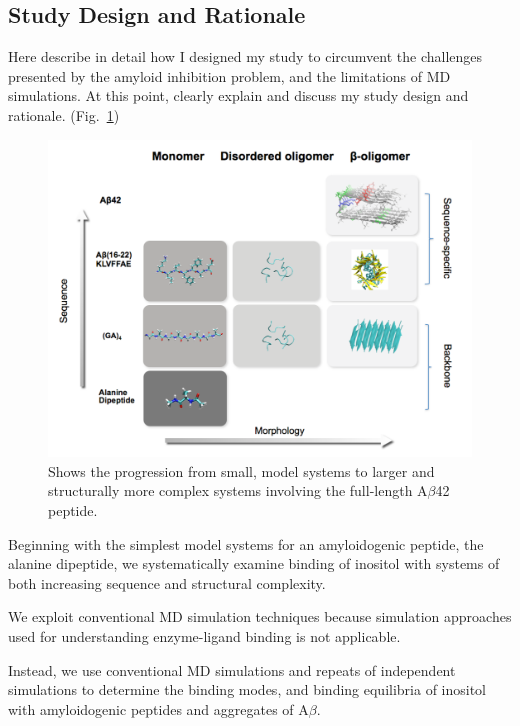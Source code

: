 \subsection{Study Design and Rationale}
\begin{outline}
	\1 Here describe in detail how I designed my study to circumvent the challenges presented by the amyloid inhibition problem, and the limitations  of MD simulations. At this point, clearly explain and discuss my study design and rationale. (Fig.~\ref{fig:rationale})

  \begin{figure}
    \centering
    \includegraphics[width=6in]{figures/introduction/matrix.pdf}
    \caption[Rationale]{Shows the progression from small, model systems to larger and structurally more complex systems involving the full-length A$\beta$42 peptide.}
    \label{fig:rationale}
  \end{figure}

	\1 Beginning with the simplest model systems for an amyloidogenic peptide, the alanine dipeptide, we systematically examine binding of inositol with systems of both increasing sequence and structural complexity.

	\1 We exploit conventional MD simulation techniques because simulation approaches used for understanding enzyme-ligand binding is not applicable. 
	
	\1 Instead, we use conventional MD simulations and repeats of independent simulations to determine the binding modes, and binding equilibria of inositol with amyloidogenic peptides and aggregates of A$\beta$.
\end{outline}


